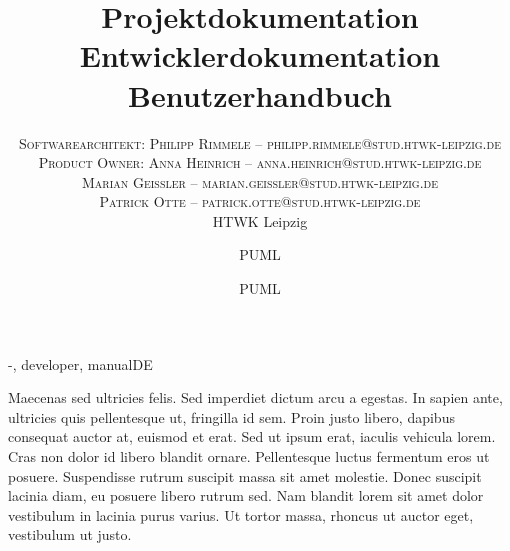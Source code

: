 \documentclass[twoside]{report}
\title{\vspace{-5mm}%
	\fontsize{24pt}{10pt}\selectfont
	\textbf{Projektdokumentation}
	}
\author{%
	\large
	\textsc{Softwarearchitekt: Philipp Rimmele -- philipp.rimmele@stud.htwk-leipzig.de} \\[2mm]
	\textsc{Product Owner: Anna Heinrich -- anna.heinrich@stud.htwk-leipzig.de} \\[2mm]
	\textsc{Marian Geißler -- marian.geissler@stud.htwk-leipzig.de} \\[2mm]
	\textsc{Patrick Otte -- patrick.otte@stud.htwk-leipzig.de} \\[2mm]
	\normalsize	HTWK Leipzig 
	}
\date{}
\title{\vspace{-5mm}%
	\fontsize{24pt}{10pt}\selectfont
	\textbf{Entwicklerdokumentation}
	}
\author{%
	\large
	\textsc{PUML} \\[2mm]
	}
\date{}
\title{\vspace{-5mm}%
	\fontsize{24pt}{10pt}\selectfont
	\textbf{Benutzerhandbuch}
	}
\author{%
	\large
	\textsc{PUML} \\[2mm]
	}
\date{}
\begin{document}

\maketitle
\thispagestyle{fancy}

\tableofcontents


\begin{shownto}{-, developer, manualDE}


Maecenas sed ultricies felis. Sed imperdiet dictum arcu a egestas. 
In sapien ante, ultricies quis pellentesque ut, fringilla id sem. Proin justo libero, dapibus consequat auctor at, euismod et erat. Sed ut ipsum erat, iaculis vehicula lorem. Cras non dolor id libero blandit ornare. Pellentesque luctus fermentum eros ut posuere. Suspendisse rutrum suscipit massa sit amet molestie. Donec suscipit lacinia diam, eu posuere libero rutrum sed. Nam blandit lorem sit amet dolor vestibulum in lacinia purus varius. Ut tortor massa, rhoncus ut auctor eget, vestibulum ut justo.
\nsecend












\nsecend





\end{shownto}
\end{document}
